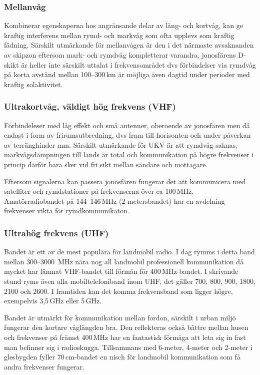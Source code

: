 \subsubsection{Mellanvåg}

Kombinerar egenskaperna hos angränsande delar av lång- och kortvåg, kan ge
kraftig interferens mellan rymd- och markvåg som ofta upplevs som kraftig
fädning. Särskilt utmärkande för mellanvågen är den i det närmaste avsaknanden
av skipzon eftersom mark- och rymdvåg kompletterar varandra, jonosfärens
D-skikt är heller inte särskilt uttalat i frekvensområdet dvs förbindelser via
rymdvåg på korta avstånd mellan 100--300\,km är möjliga även dagtid under
perioder med kraftig solaktivitet.

\subsubsection{Ultrakortvåg, väldigt hög frekvens (VHF)}

Förbindeleser med låg effekt och små antenner, oberoende av jonosfären men då
endast i form av frirumsutbredning, dvs fram till horisonten och under
påverkan av terränghinder mm. Särskilt utmärkande för UKV är att rymdvåg
saknas, markvågsdämpningen till lands är total och kommunikation på högre
frekvenser i princip därför bara sker vid fri sikt mellan sändare och
mottagare.

Eftersom signalerna kan passera jonosfären fungerar det att kommunicera med
satelliter och rymdstationer på frekvenserna över ca
100\,MHz. Amatörradiobandet på 144--146\,MHz (2-metersbandet) har en avdelning
frekvenser vikta för rymdkommunikaton.

\subsubsection{Ultrahög frekvens (UHF)}

Bandet är ett av de mest populära för landmobil radio. I dag rymms i detta
band mellan 300--3000\- \,MHz nära nog all landmobil professionell
kommunikation då mycket har lämnat VHF-bandet till förmån för
400\,MHz-bandet. I skrivande stund ryms även alla mobiltelefoniband inom UHF,
det gäller 700, 800, 900, 1800, 2100 och 2600. I framtiden kan det komma
frekvensband som ligger högre, exempelvis 3,5\,GHz eller 5\,GHz.

Bandet är utmärkt för kommunikation mellan fordon, särskilt i urban miljö
fungerar den kortare våglängden bra. Den reflekteras också bättre mellan husen
och frekvenser på främst 400\,MHz har en fantastisk förmåga att leta sig in
fast man befinner sig i radioskugga. Tillsammans med 6-meter, 4-meter och
2-meter i glesbygden fyller 70\,cm-bandet en nisch för landmobil kommunikation
som få andra frekvenser fungerar.

